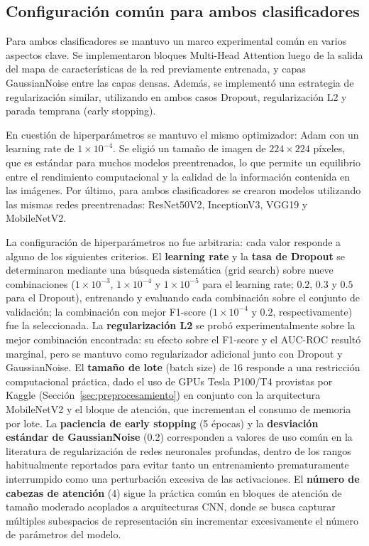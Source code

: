 \subsection{Configuración común para ambos clasificadores}

Para ambos clasificadores se mantuvo un marco experimental común en varios aspectos 
clave. Se implementaron bloques Multi-Head Attention luego de la salida del mapa de 
características de la red previamente entrenada, y capas GaussianNoise entre las capas 
densas. Además, se implementó una estrategia de regularización similar, utilizando en 
ambos casos Dropout, regularización L2 y parada temprana (early stopping).

En cuestión de hiperparámetros se mantuvo el mismo optimizador: Adam con un learning rate 
de $1 \times 10^{-4}$. Se eligió un tamaño de imagen de $224 \times 224$ píxeles, que es 
estándar para muchos modelos preentrenados, lo que permite un equilibrio entre el 
rendimiento computacional y la calidad de la información contenida en las imágenes. Por 
último, para ambos clasificadores se crearon modelos utilizando las mismas redes 
preentrenadas: ResNet50V2, InceptionV3, VGG19 y MobileNetV2.

La configuración de hiperparámetros no fue arbitraria: cada valor responde a alguno de
los siguientes criterios. El \textbf{learning rate} y la \textbf{tasa de Dropout} se
determinaron mediante una búsqueda sistemática (grid search) sobre nueve combinaciones
($1 \times 10^{-3}$, $1 \times 10^{-4}$ y $1 \times 10^{-5}$ para el learning rate;
$0.2$, $0.3$ y $0.5$ para el Dropout), entrenando y evaluando cada combinación sobre el
conjunto de validación; la combinación con mejor F1-score
($1 \times 10^{-4}$ y $0.2$, respectivamente) fue la seleccionada. La
\textbf{regularización L2} se probó experimentalmente sobre la mejor combinación
encontrada: su efecto sobre el F1-score y el AUC-ROC resultó marginal, pero se mantuvo
como regularizador adicional junto con Dropout y GaussianNoise. El \textbf{tamaño de
lote} (batch size) de 16 responde a una restricción computacional práctica, dado el uso
de GPUs Tesla P100/T4 provistas por Kaggle (Sección~\ref{sec:preprocesamiento}) en
conjunto con la arquitectura MobileNetV2 y el bloque de atención, que incrementan el
consumo de memoria por lote. La \textbf{paciencia de early stopping} (5 épocas) y la
\textbf{desviación estándar de GaussianNoise} (0.2) corresponden a valores de uso común
en la literatura de regularización de redes neuronales profundas, dentro de los rangos
habitualmente reportados para evitar tanto un entrenamiento prematuramente interrumpido
como una perturbación excesiva de las activaciones. El \textbf{número de cabezas de
atención} (4) sigue la práctica común en bloques de atención de tamaño moderado
acoplados a arquitecturas CNN, donde se busca capturar múltiples subespacios de
representación sin incrementar excesivamente el número de parámetros del modelo.

